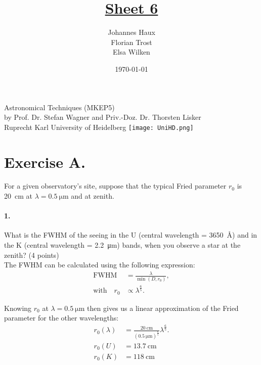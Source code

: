 \documentclass[11pt,a4paper,twoside]{article}
\title{\LARGE \underline {Sheet 6}}
\author{Johannes Haux \\ Florian Trost \\ Elsa Wilken}
\date{\today}
\newcommand{\op}[1]{\operatorname{#1}}
\begin{document}
\maketitle
\thispagestyle{empty}

\begin{center}
  Astronomical Techniques (MKEP5) \\
  \baselineskip35pt
  by Prof. Dr. Stefan Wagner and Priv.-Doz. Dr. Thorsten Lisker \\
  \baselineskip60pt
  Ruprecht Karl University of Heidelberg
\vskip 40pt
\texttt{[image: UniHD.png]}

\end{center}

\newpage
\setcounter{page}{1}		%

\section*{Exercise A.}
For a given observatory's site, suppose that the typical Fried parameter $r_0$
is \SI{20}{\centi\meter} at $\lambda = \SI{0.5}{\micro\meter}$ and at zenith.  

\paragraph{1.} What is the FWHM of the seeing in the U (central wavelength =
\SI{3650}{\angstrom}) and in the K (central wavelength =
\SI{2.2}{\micro\meter}) bands, when you observe a star at the zenith? (4
points) \\

The FWHM can be calculated using the following expression:
\begin{align}
\mathrm{FWHM} &= \frac{\lambda}{\op{min}\left(D, r_0 \right)}, \\ \label{eq:S0}
\text{with} \quad r_0 &\propto \lambda^{\frac{6}{5}}.
\end{align}

Knowing $r_0$ at $\lambda = \SI{0.5}{\micro\meter}$ then gives us a linear 
approximation of the Fried parameter for the other wavelengths:
\begin{align}
r_0(\lambda) &= \frac{\SI{20}{\centi\meter}}
                     {\left(\SI{0.5}{\micro\meter}\right)^{\frac{6}{5}}}
                \lambda^{\frac{6}{5}}. \\ \label{eq:r0}
r_0(U) &= \SI{13.7}{\centi\meter}   \\
r_0(K) &= \SI{118}{\centi\meter}
\end{align}
\end{document}
